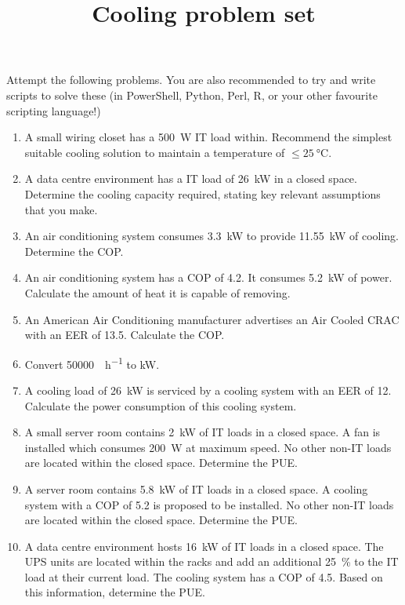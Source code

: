 \documentclass{pgnotes}
\title{Cooling problem set}
\begin{document}
\maketitle

Attempt the following problems.
You are also recommended to try and write scripts to solve these (in PowerShell, Python, Perl, R, or your other favourite scripting language!)

\begin{enumerate}

\item
  A small wiring closet has a \SI{500}{\watt} IT load within.
  Recommend the simplest suitable cooling solution to maintain a temperature of $\le \SI{25}{\celsius}$.

\item
  A data centre environment has a IT load of \SI{26}{\kilo\watt} in a closed space.
  Determine the cooling capacity required, stating key relevant assumptions that you make.
  
\item
  An air conditioning system consumes \SI{3.3}{\kilo\watt} to provide \SI{11.55}{\kilo\watt} of cooling.
  Determine the COP.
  
\item 
  An air conditioning system has a COP of 4.2.
  It consumes \SI{5.2}{\kilo\watt} of power.
  Calculate the amount of heat it is capable of removing.

\item
  An American Air Conditioning manufacturer advertises an Air Cooled CRAC with an EER of 13.5.
  Calculate the COP. %
  
\item
  Convert \SI{50000}{\BTU\per\hour} to \si{\kilo\watt}.

\item
  A cooling load of \SI{26}{\kilo\watt} is serviced by a cooling system with an EER of 12.
  Calculate the power consumption of this cooling system.

\item
  A small server room contains \SI{2}{\kilo\watt} of IT loads in a closed space.
  A fan is installed which consumes \SI{200}{\watt} at maximum speed.
  No other non-IT loads are located within the closed space.
  Determine the PUE. 

\item
  A server room contains \SI{5.8}{\kilo\watt} of IT loads in a closed space.
  A cooling system with a COP of 5.2 is proposed to be installed.
  No other non-IT loads are located within the closed space.
  Determine the PUE.
  
\item
  A data centre environment hosts \SI{16}{\kilo\watt} of IT loads in a closed space.
  The UPS units are located within the racks and add an additional \SI{25}{\percent} to the IT load at their current load.
  The cooling system has a COP of 4.5.
  Based on this information, determine the PUE.
  
\end{enumerate}
\end{document}

